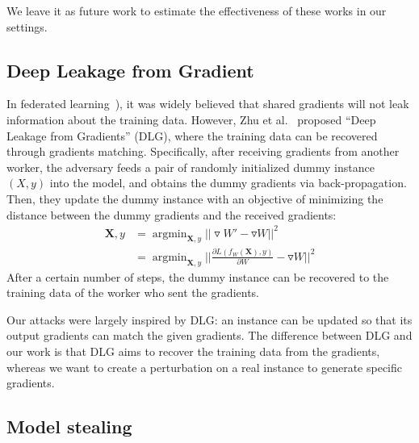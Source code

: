 \documentclass[conference]{IEEEtran}
\newcommand{\XX}{\mathbf{X}\xspace}
\begin{document}
We leave it as future work to {estimate\EndAccSupp{}} the {effectiveness\EndAccSupp{}} of these works in our settings.

\subsection{Deep Leakage from Gradient}

In federated learning~\cite{mcmahan17a, bonawitz2019towards, li2020federated, kairouz2019advances}), 
it was widely believed that shared gradients will not leak {information\EndAccSupp{}} about the training data.
However, Zhu et al.~\cite{zhu2020deepleakage} proposed ``Deep Leakage from Gradients'' (DLG), where the training data can be recovered through gradients matching.
Specifically, after receiving gradients from another worker, the adversary feeds a pair of randomly initialized dummy instance $(X, y)$ into the model, and obtains the dummy gradients via back-propagation.
Then, they update the dummy instance with an objective of minimizing the distance between the dummy gradients and the received gradients:
\begin{equation*}
    \begin{aligned}
  \XX, y &= \mathop{\arg\min}_{\XX, y}||\triangledown W'-\triangledown W||^2\\&= \mathop{\arg\min}_{\XX, y}||\frac{\partial L(f_W(\XX), y)}{\partial W}-\triangledown W||^2
    \end{aligned}
\end{equation*}
After a certain number of steps, the dummy instance can be recovered to the training data of the {worker\EndAccSupp{}} who sent the gradients. 


Our attacks were largely inspired by DLG: 
an instance can be updated so that its {output\EndAccSupp{}} gradients can {match\EndAccSupp{}} the given gradients.
The difference between DLG and our work is that DLG aims to recover the training data from the gradients, whereas we want to create a perturbation on a real instance to generate {specific\EndAccSupp{}} gradients.

\subsection{Model stealing}
\end{document}
